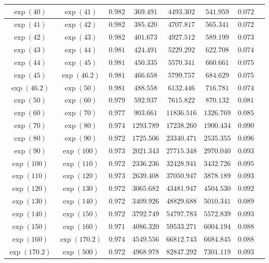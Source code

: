 \documentclass[reqno]{amsart}
\numberwithin{equation}{section}
\theoremstyle{remark}
\begin{document}
\begin{table}[h]
\begin{tabular}{|c|c|c|c|c|c|c|c|}
\hline
$\exp(40)$ & $\exp(41)$ &  $0.982$& $369.491$ & $4493.302$ & $541.959$ & $0.072$\\
\hline
$\exp(41)$ & $\exp(42)$ &  $0.982$& $385.420$ & $4707.817$ & $565.341$ & $0.072$\\
\hline
$\exp(42)$ & $\exp(43)$ &  $0.982$& $401.673$ & $4927.512$ & $589.199$ & $0.073$\\
\hline
$\exp(43)$ & $\exp(44)$ &  $0.981$& $424.491$ & $5229.292$ & $622.708$ & $0.074$\\
\hline
$\exp(44)$ & $\exp(45)$ &  $0.981$& $450.335$ & $5570.341$ & $660.661$ & $0.075$\\
\hline
$\exp(45)$ & $\exp(46.2)$ &  $0.981$& $466.658$ & $5799.757$ & $684.629$ & $0.075$\\
\hline
$\exp(46.2)$ & $\exp(50)$ & $0.981 $ & $488.558 $ & $6132.446 $ & $716.781$ & $0.074$\\
\hline
$\exp(50)$ & $\exp(60)$ & $0.979 $ & $592.937$ & $7615.822 $& $870.132$&$0.081$\\
\hline
$\exp(60)$ & $\exp(70)$ & $0.977 $ & $903.661 $ & $11836.516 $& $1326.769$ & $0.085$\\
\hline
$\exp(70)$ & $\exp(80)$ & $0.974 $ & $1293.789$ & $17238.260 $& $1900.434$ & $0.090$\\
\hline
$\exp(80)$ & $\exp(90)$ & $0.972 $ & $1725.506 $ & $23340.471 $& $2535.355$ & $0.096$\\
\hline
$\exp(90)$ & $\exp(100)$ & $0.973 $ & $2021.343 $ & $27715.348$& $2970.040$ & $0.093$\\
\hline
$\exp(100)$ & $\exp(110)$ & $0.972 $ & $2336.236 $ & $ 32428.941 $& $3432.726$ & $0.095$\\
\hline
$\exp(110)$ & $\exp(120)$ & $0.973 $ & $ 2639.408$ & $37050.947 $& $3878.189$& $0.093$\\
\hline
$\exp(120)$ & $\exp(130)$ & $0.972 $ & $3065.682 $ & $43481.947$& $4504.530$& $0.092$\\
\hline
$\exp(130)$ & $\exp(140)$ &  $0.972$& $3409.926$ & $48829.688$ & $5010.341$ & $0.089$\\
\hline
$\exp(140)$ & $\exp(150)$ &  $0.972$& $3792.749$ & $54797.783$ & $5572.839$ & $0.093$\\
\hline
$\exp(150)$ & $\exp(160)$ &  $0.971$& $4086.320$ & $59533.271$ & $6004.194$ & $0.088$\\
\hline
$\exp(160)$ & $\exp(170.2)$ &  $0.974$& $4549.556$ & $66812.743$ & $6684.845$ & $0.088$\\
\hline
$\exp(170.2)$ & $\exp(500)$ &  $0.972 $& $4968.978 $ & $82847.292 $ & $7301.119 $ & $0.093 $\\

\end{tabular}
\end{table}
\end{document}
